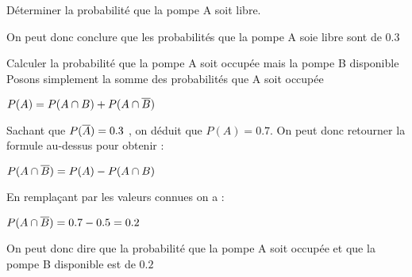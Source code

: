 \begin{exo}
\begin{subexo}{Déterminer la probabilité que la pompe A soit libre.}
\begin{center}
  \end{center}
  On peut donc conclure que les probabilités que la pompe A soie libre sont de 0.3
\end{subexo}
\begin{subexo}{Calculer la probabilité que la pompe A soit occupée mais la pompe B disponible}
  Posons simplement la somme des probabilités que A soit occupée
  \begin{center}
    $P(A) = P(A \cap B) + P(A \cap \overline{B})$
  \end{center}
  Sachant que $P(\overline{A}) = 0.3$ , on déduit que $P(A) = 0.7$. On peut donc retourner la formule au-dessus pour obtenir :
  \begin{center}
    $P(A \cap \overline{B}) = P(A) - P(A \cap B)$
  \end{center}
En remplaçant par les valeurs connues on a :
\begin{center}
  $P(A \cap \overline{B}) = 0.7 - 0.5 = 0.2$
\end{center}
On peut donc dire que la probabilité que la pompe A soit occupée et que la pompe B disponible est de $0.2$
\end{subexo}
\end{exo}
